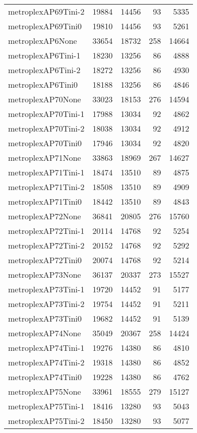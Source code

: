 \begin{longtable}{lrrrr}
metroplexAP69Tini-2 & 19884 & 14456 & 93 & 5335 \\
metroplexAP69Tini0 & 19810 & 14456 & 93 & 5261 \\
metroplexAP6None & 33654 & 18732 & 258 & 14664 \\
metroplexAP6Tini-1 & 18230 & 13256 & 86 & 4888 \\
metroplexAP6Tini-2 & 18272 & 13256 & 86 & 4930 \\
metroplexAP6Tini0 & 18188 & 13256 & 86 & 4846 \\
metroplexAP70None & 33023 & 18153 & 276 & 14594 \\
metroplexAP70Tini-1 & 17988 & 13034 & 92 & 4862 \\
metroplexAP70Tini-2 & 18038 & 13034 & 92 & 4912 \\
metroplexAP70Tini0 & 17946 & 13034 & 92 & 4820 \\
metroplexAP71None & 33863 & 18969 & 267 & 14627 \\
metroplexAP71Tini-1 & 18474 & 13510 & 89 & 4875 \\
metroplexAP71Tini-2 & 18508 & 13510 & 89 & 4909 \\
metroplexAP71Tini0 & 18442 & 13510 & 89 & 4843 \\
metroplexAP72None & 36841 & 20805 & 276 & 15760 \\
metroplexAP72Tini-1 & 20114 & 14768 & 92 & 5254 \\
metroplexAP72Tini-2 & 20152 & 14768 & 92 & 5292 \\
metroplexAP72Tini0 & 20074 & 14768 & 92 & 5214 \\
metroplexAP73None & 36137 & 20337 & 273 & 15527 \\
metroplexAP73Tini-1 & 19720 & 14452 & 91 & 5177 \\
metroplexAP73Tini-2 & 19754 & 14452 & 91 & 5211 \\
metroplexAP73Tini0 & 19682 & 14452 & 91 & 5139 \\
metroplexAP74None & 35049 & 20367 & 258 & 14424 \\
metroplexAP74Tini-1 & 19276 & 14380 & 86 & 4810 \\
metroplexAP74Tini-2 & 19318 & 14380 & 86 & 4852 \\
metroplexAP74Tini0 & 19228 & 14380 & 86 & 4762 \\
metroplexAP75None & 33961 & 18555 & 279 & 15127 \\
metroplexAP75Tini-1 & 18416 & 13280 & 93 & 5043 \\
metroplexAP75Tini-2 & 18450 & 13280 & 93 & 5077 \\

\end{longtable}
